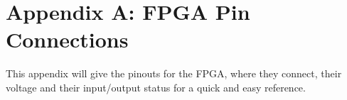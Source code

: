 \section{Appendix A: FPGA Pin Connections} %
\label{sec:appendix-a}
    This appendix will give the pinouts for the FPGA, where they connect, their voltage and their
    input/output status for a quick and easy reference.
